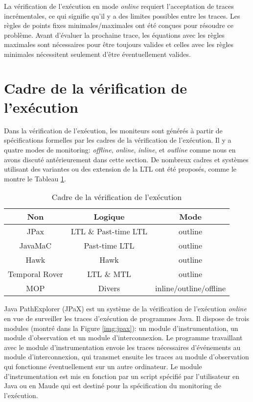 La vérification de l'exécution en mode \emph{online} requiert l'acceptation de traces incrémentales, ce qui signifie qu'il y a des limites possibles entre les traces. Les règles de points fixes minimales/maximales ont été conçues pour résoudre ce problème. Avant d'évaluer la prochaine trace, les équations avec les règles maximales sont nécessaires pour être toujours valides et celles avec les règles minimales nécessitent seulement d'être éventuellement valides.

\section{Cadre de la vérification de l'exécution}\label{sec:rv:frameworks}

Dans la vérification de l'exécution, les moniteurs sont générés à partir de spécifications formelles par les cadres de la vérification de l'exécution. Il y a quatre modes de monitoring: \emph{offline}, \emph{online}, \emph{inline}, et \emph{outline} comme nous en avons discuté antérieurement dans cette section. De nombreux cadres et systèmes utilisant des variantes ou des extension de la LTL ont été proposés, comme le montre le Tableau \ref{table:rvframeworks}.

\begin{table}[h]
\centering
\begin{tabular}{|c|c|c|}
\hline
Non & Logique & Mode \\
\hline
JPax\citep{havelund2001java} & LTL \& Past-time LTL & outline \\
\hline
JavaMaC\citep{kim2004java} & Past-time LTL & outline \\
\hline
Hawk \citep{d2005event} & Hawk & outline \\
\hline
Temporal Rover\citep{drusinsky2000temporal} & LTL \& MTL & outline \\
\hline
MOP \citep{chen2007mop} & Divers & inline/outline/offline \\
\hline
\end{tabular}
\caption{Cadre de la vérification de l'exécution}
\label{table:rvframeworks}
\end{table}

Java PathExplorer (JPaX) \citep{havelund2001java} est un système de la vérification de l'exécution \emph{online} en vue de surveiller les traces d'exécution de programmes Java. Il dispose de trois modules (montré dans la Figure \ref{img:jpax}): un module d'instrumentation, un module d'observation et un module d'interconnexion. Le programme travaillant avec le module d'instrumentation envoie les traces nécessaires d'événements au module d'interconnexion, qui transmet ensuite les traces au module d'observation qui fonctionne éventuellement sur un autre ordinateur. Le module d'instrumentation est mis en fonction par un script spécifié par l'utilisateur en Java ou en Maude qui est destiné pour la spécification du monitoring de l'exécution.

